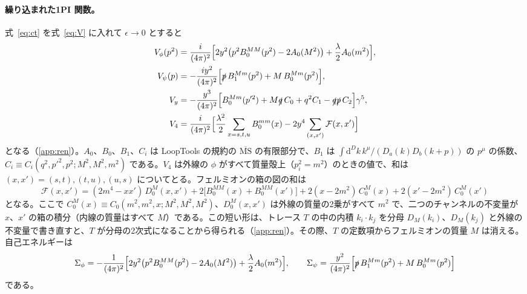 \documentclass[a4paper,10pt]{ltjsarticle}
\newcommand{\dd}{\mathrm{d}}
\newcommand{\MSbar}{\overline{\mathrm{MS}}}
\begin{document}
\paragraph{繰り込まれた1PI 関数。}式~\eqref{eq:ct} を式~\eqref{eq:V} に入れて $\epsilon\to0$ とすると
\begin{equation}
\begin{aligned}
V_\phi(p^2)&=\frac{i}{(4\pi)^2}\Bigl[2y^2\bigl(p^2B_0^{MM}(p^2)-2A_0(M^2)\bigr)+\frac{\lambda}{2}A_0(m^2)\Bigr],\\
V_\psi(p)&=-\frac{iy^2}{(4\pi)^2}\Bigl[\slashed p\,B_1^{Mm}(p^2)+M\,B_0^{Mm}(p^2)\Bigr],\\
V_y&=-\frac{y^3}{(4\pi)^2}\Bigl[B_0^{Mm}(p'^2)+M\slashed q\,C_0+q^2C_1-\slashed q\slashed p\,C_2\Bigr]\gamma^5,\\
V_4&=\frac{i}{(4\pi)^2}\Bigl[\frac{\lambda^2}{2}\sum_{x=s,t,u}B_0^{mm}(x)-2y^4\sum_{(x,x')}\mathcal F(x,x')\Bigr]
\end{aligned}
\label{eq:VR}
\end{equation}
となる（\ref{app:ren}）。$A_0$、$B_0$、$B_1$、$C_i$ は LoopTools の規約の $\MSbar$ の有限部分で、$B_1$ は $\int\dd^Dk\,k^\mu/(D_a(k)D_b(k+p))$ の $p^\mu$ の係数、$C_i\equiv C_i(q^2,p'^2,p^2;M^2,M^2,m^2)$ である。$V_4$ は外線の $\phi$ がすべて質量殻上（$p_i^2=m^2$）のときの値で、和は $(x,x')=(s,t),(t,u),(u,s)$ についてとる。フェルミオンの箱の図の和は
\begin{equation}
\mathcal F(x,x')=(2m^4-xx')\,D_0^{M}(x,x')+2\bigl[B_0^{MM}(x)+B_0^{MM}(x')\bigr]+2(x-2m^2)\,C_0^{M}(x)+2(x'-2m^2)\,C_0^{M}(x')
\label{eq:box}
\end{equation}
となる。ここで $C_0^M(x)\equiv C_0(m^2,m^2,x;M^2,M^2,M^2)$、$D_0^M(x,x')$ は外線の質量の2乗がすべて $m^2$ で、二つのチャンネルの不変量が $x$、$x'$ の箱の積分（内線の質量はすべて $M$）である。この短い形は、トレース $T$ の中の内積 $k_i\cdot k_j$ を分母 $D_M(k_i)$、$D_M(k_j)$ と外線の不変量で書き直すと、$T$ が分母の2次式になることから得られる（\ref{app:ren}）。その際、$T$ の定数項からフェルミオンの質量 $M$ は消える。自己エネルギーは
\begin{equation*}
\Sigma_\phi=-\frac{1}{(4\pi)^2}\Bigl[2y^2\bigl(p^2B_0^{MM}(p^2)-2A_0(M^2)\bigr)+\frac{\lambda}{2}A_0(m^2)\Bigr],\qquad
\Sigma_\psi=\frac{y^2}{(4\pi)^2}\Bigl[\slashed p\,B_1^{Mm}(p^2)+M\,B_0^{Mm}(p^2)\Bigr]
\end{equation*}
である。
\end{document}
